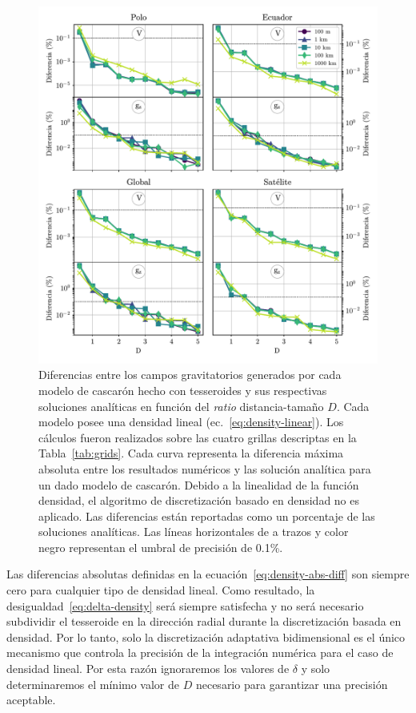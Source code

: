 \begin{figure}
\centering
\includegraphics[width=\linewidth]{figs/tesseroids-variable-density/linear-density-diffs.pdf}
\caption{
    Diferencias entre los campos gravitatorios generados por cada modelo de
    cascarón hecho con tesseroides y sus respectivas soluciones analíticas en
    función del \emph{ratio} distancia-tamaño $D$.
    Cada modelo posee una densidad lineal (ec.~\ref{eq:density-linear}).
    Los cálculos fueron realizados sobre las cuatro grillas descriptas en la
    Tabla~\ref{tab:grids}.
    Cada curva representa la diferencia máxima absoluta entre los resultados
    numéricos y las solución analítica para un dado modelo de cascarón.
    Debido a la linealidad de la función densidad, el algoritmo de
    discretización basado en densidad no es aplicado.
    Las diferencias están reportadas como un porcentaje de las soluciones
    analíticas.
    Las líneas horizontales de a trazos y color negro representan el umbral de
    precisión de 0.1\%.
}
\label{fig:D-linear}
\end{figure}

Las diferencias absolutas definidas en la ecuación~\ref{eq:density-abs-diff}
son siempre cero para cualquier tipo de densidad lineal.
Como resultado, la desigualdad~\ref{eq:delta-density} será siempre satisfecha
y no será necesario subdividir el tesseroide en la dirección radial durante la
discretización basada en densidad.
Por lo tanto, solo la discretización adaptativa bidimensional es el único
mecanismo que controla la precisión de la integración numérica para el caso de
densidad lineal.
Por esta razón ignoraremos los valores de $\delta$ y solo determinaremos el
mínimo valor de $D$ necesario para garantizar una precisión aceptable.

